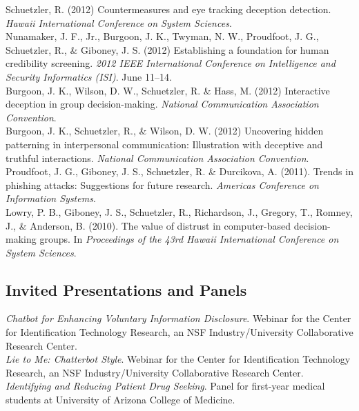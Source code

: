 \documentclass[10pt, letter]{article}
\newcommand{\years}[1]{\marginnote{\scriptsize #1}}
\begin{document}
\years{2012}Schuetzler, R. (2012) Countermeasures and eye tracking deception
detection. \emph{Hawaii International Conference on System Sciences}.\\

Nunamaker, J. F., Jr., Burgoon, J. K., Twyman, N. W., Proudfoot, J. G.,
Schuetzler, R., \& Giboney, J. S. (2012) Establishing a foundation for human
credibility screening. \emph{2012 IEEE International Conference on Intelligence
  and Security Informatics (ISI)}. June 11--14.\\

Burgoon, J. K., Wilson, D. W., Schuetzler, R. \& Hass, M. (2012) Interactive
deception in group decision-making. \emph{National Communication Association
  Convention}.\\

Burgoon, J. K., Schuetzler, R., \& Wilson, D. W. (2012) Uncovering hidden
patterning in interpersonal communication: Illustration with deceptive and
truthful interactions. \emph{National Communication Association Convention}.\\

\years{2011}Proudfoot, J. G., Giboney, J. S., Schuetzler, R. \& Durcikova,
A. (2011). Trends in phishing attacks: Suggestions for future
research. \emph{Americas Conference on Information Systems}.\\

\years{2010}Lowry, P. B., Giboney, J. S., Schuetzler, R., Richardson, J.,
Gregory, T., Romney, J., \& Anderson, B. (2010). The value of distrust in
computer-based decision-making groups. In \emph{Proceedings of the 43rd Hawaii
  International Conference on System Sciences}.


\subsection*{Invited Presentations and Panels}
\noindent

\years{2016}\emph{Chatbot for Enhancing Voluntary Information Disclosure}. Webinar for the Center for Identification
Technology Research, an NSF Industry/University Collaborative Research Center.\\

\years{2015}\emph{Lie to Me: Chatterbot Style}. Webinar for the Center for Identification
Technology Research, an NSF Industry/University Collaborative Research Center.\\

\years{2014}\emph{Identifying and Reducing Patient Drug Seeking}. Panel for first-year
medical students at University of Arizona College of Medicine.\\
\end{document}
